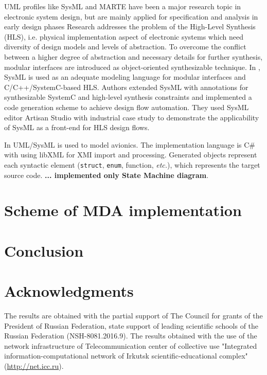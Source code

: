\documentclass{llncs}
\begin{document}
UML profiles like SysML and MARTE have been a major research topic in electronic system design, but are mainly applied for specification and analysis in early design phases Research \cite{mish} addresses the problem of the High-Level Synthesis (HLS), i.e. physical implementation aspect of electronic systems which need diversity of design models and levels of abstraction.  To overcome the conflict between a higher degree of abstraction and necessary details for further synthesis, modular interfaces are introduced as object-oriented synthesizable technique. In \cite{mish},  SysML is used as an adequate modeling language for modular interfaces and C/C++/SystemC-based HLS. Authors extended SysML with annotations for synthesizable SystemC and high-level synthesis constraints and implemented a code generation scheme to achieve design flow automation. They used SysML editor Artisan Studio with industrial case study to demonstrate the applicability of SysML as a front-end for HLS design flows.

In \cite{tom16} UML/SysML is used to model avionics.  The implementation language is C\# with using libXML for XMI import and processing.  Generated objects represent each syntactic element (\texttt{struct}, \texttt{enum}, function, \emph{etc.}), which represents the target source code.  \textbf{... implemented only State Machine diagram}.

\cite{fab}



\section{Scheme of MDA implementation}
\label{sec:mda-impl-scheme}

\section{Conclusion}


\section{Acknowledgments}
\label{sec:acks}

The results are obtained with the partial support of The Council for grants of the President of Russian Federation, state support of leading scientific schools of the Russian Federation (NSH-8081.2016.9). The results obtained with the use of the network infrastructure of Telecommunication center of collective use "Integrated information-computational network of Irkutsk scientific-educational complex" (\url{http://net.icc.ru}).
\end{document}
